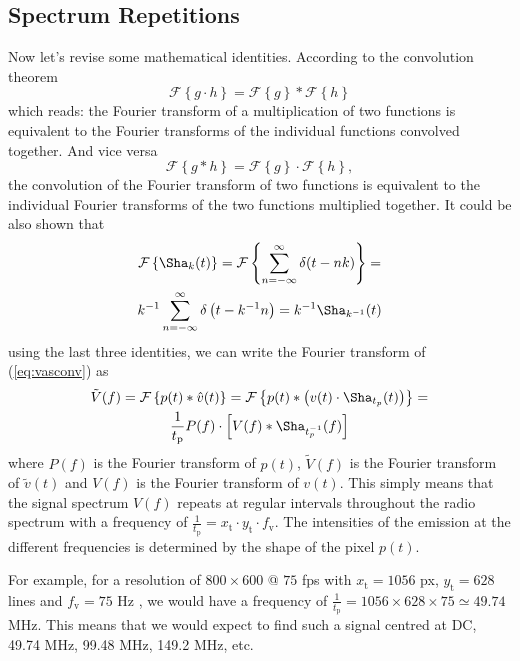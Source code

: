 \documentclass[a4paper,12pt,twoside,openright]{report}
\begin{document}
\subsection{Spectrum Repetitions}
Now let's revise some mathematical identities. According to the convolution theorem \cite{arfkenconvolution}
\begin{equation}
\mathcal{F} \left\{ g \cdot h \right\} = \mathcal{F} \left\{ g \right\} \ast  \mathcal{F} \left\{ h \right\}
\end{equation}
which reads: the Fourier transform of a multiplication of two functions is equivalent to the Fourier transforms of the individual functions convolved together. And vice versa
\begin{equation}
\mathcal{F} \left\{ g \ast h \right\} = \mathcal{F} \left\{ g \right\} \cdot  \mathcal{F} \left\{ h \right\} ,
\end{equation}
the convolution of the Fourier transform of two functions is equivalent to the individual Fourier transforms of the two functions multiplied together.
It could be also shown that
\begin{multline}
\mathcal{F} \left\{ \Sha_{k} (t) \right\} = 
\mathcal{F} \left\{ \sum\limits_{n=-\infty}^{\infty}  \delta(t-n k) \right\} = \\
k^{-1} \sum\limits_{n=-\infty}^{\infty}  \delta \left( t-k^{-1} n \right) =
k^{-1} \Sha_{k^{-1}}(t)
\end{multline}
using the last three identities, we can write the Fourier transform of (\ref{eq:vasconv}) as
\begin{multline} 
\label{eq:vspectrum}
\tilde{V}(f) = \mathcal{F} \left\{ p(t) \ast \hat{v}(t) \right\} = \mathcal{F} \left\{ p(t) \ast \left( v(t) \cdot \Sha_{t_{p}}(t) \right) \right\} = \\
\frac{1}{t_\text{p}} P(f) \cdot  \left[ V(f) \ast
\Sha_{t_{p}^{-1}}(f)  \right]
\end{multline}
where $P(f)$ is the Fourier transform of $p(t)$, $\tilde{V}(f)$ is the Fourier transform of $\tilde{v}(t)$ and $V(f)$ is the Fourier transform of $v(t)$. This simply means that the signal spectrum $V(f)$ repeats at regular intervals throughout the radio spectrum with a frequency of $\frac{1}{t_\text{p}} = x_\text{t} \cdot y_\text{t} \cdot f_\text{v}$. The intensities of the emission at the different frequencies is determined by the shape of the pixel $p(t)$.

For example, for a resolution of $800 \times 600 $ @ $ 75$ fps with $x_\text{t} = 1056$ px, $y_\text{t} = 628$ lines and $f_\text{v} = 75$ Hz , we would have a frequency of $\frac{1}{t_\text{p}} = 1056 \times 628 \times 75 \simeq 49.74$ MHz. This means that we would expect to find such a signal centred at DC, 49.74 MHz, 99.48 MHz, 149.2 MHz, etc.
\end{document}
